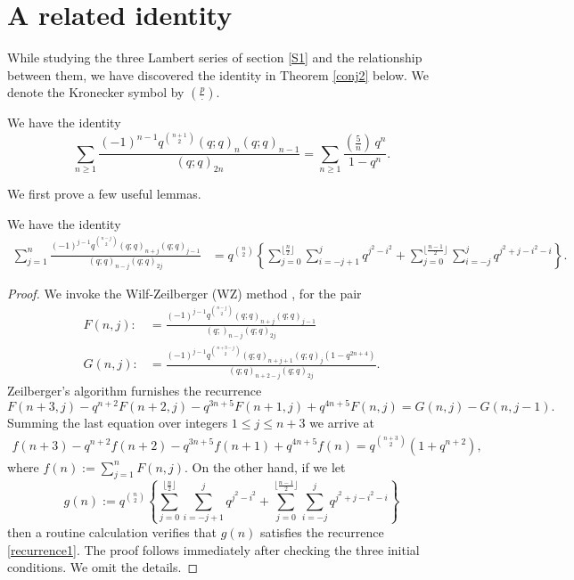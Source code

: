 \documentclass[a4paper,reqno,12pt]{amsart}
\begin{document}
\section{A related identity}




While studying the three Lambert series of section \ref{S1} and the relationship between them, we have discovered the identity in Theorem \ref{conj2} below. 
We denote the Kronecker symbol by $(\frac{p}{\cdot})$. 



\begin{theorem} \label{conj2}   We have the identity
$$\sum_{n\geq1} \frac{(-1)^{n-1}  q^{\binom{n+1}2} (q;q)_n(q;q)_{n-1}}{(q;q)_{2n}} = \sum_{n\geq1} \frac{(\frac{5}n)\, q^n}{1-q^n}.$$
\end{theorem}

We first prove a few useful lemmas.

\begin{lemma} \label{lemma1} We have the identity
\begin{align}\label{WZ-lemma}
\sum_{j=1}^n\frac{(-1)^{j-1}q^{\binom{n-j}2}(q;q)_{n+j}(q;q)_{j-1}}{(q;q)_{n-j}(q;q)_{2j}}
&= q^{\binom{n}2} 
\left\{ \sum _{j=0}^{\lfloor\frac{n}2\rfloor}\sum_{i=-j+1}^j q^{j^2-i^2} +  
\sum _{j=0}^{\lfloor\frac{n-1}2\rfloor}\sum_{i=-j}^j q^{j^2+j-i^2-i}     \right\}.   
\end{align}
\end{lemma}

\begin{proof} We invoke  the Wilf-Zeilberger (WZ) method \cite{WZ}, for the pair
\begin{align*} F(n,j):&=\frac{(-1)^{j-1}q^{\binom{n-j}2}(q;q)_{n+j}(q;q)_{j-1}}{(q;)_{n-j}(q;q)_{2j}}    \\ 
G(n,j):&=\frac{(-1)^{j-1}q^{\binom{n+3-j}2}(q;q)_{n+j+1}(q;q)_j(1-q^{2n+4})}{(q;q)_{n+2-j}(q;q)_{2j}}. 
\end{align*}
Zeilberger's algorithm  furnishes the recurrence
$$F(n+3,j)-q^{n+2}F(n+2,j)-q^{3n+5}F(n+1,j)+q^{4n+5}F(n,j) = G(n,j)-G(n,j-1).$$
Summing the last equation over integers $1\leq j\leq n+3$ we arrive at
\begin{align} \label{recurrence1} 
f(n+3)-q^{n+2}f(n+2)-q^{3n+5}f(n+1)+q^{4n+5}f(n) = q^{\binom{n+3}2}(1+q^{n+2}),
\end{align}
where $f(n):=\sum_{j=1}^nF(n,j)$. On the other hand, if we let 
$$g(n):= q^{\binom{n}2} 
\left\{ \sum _{j=0}^{\lfloor\frac{n}2\rfloor}\sum_{i=-j+1}^j q^{j^2-i^2} +  
\sum _{j=0}^{\lfloor\frac{n-1}2\rfloor}\sum_{i=-j}^j q^{j^2+j-i^2-i} \right\}$$
then a routine calculation verifies that $g(n)$ satisfies the recurrence \eqref{recurrence1}. The proof follows immediately after checking the three initial conditions.   We omit the details.
\end{proof}
\end{document}
